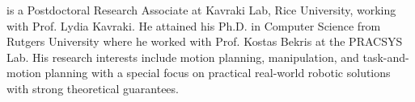 

\vspace{0.3in}
 is a Postdoctoral Research Associate at Kavraki Lab, Rice University, working with Prof. Lydia Kavraki. He attained his Ph.D. in Computer Science from Rutgers University where he worked with Prof. Kostas Bekris at the PRACSYS Lab. His research interests include motion
planning, manipulation, and task-and-motion planning with a special focus on practical real-world robotic solutions with strong theoretical guarantees. 

